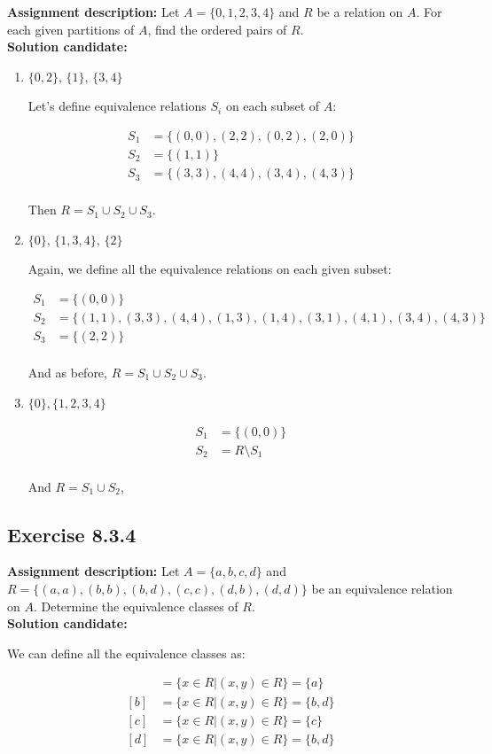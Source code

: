 \documentclass{report}
\newcommand{\mAlign}[1]{\begin{align*}#1\end{align*}}
\newcommand{\In}{\! \in \!}
\newcommand{\assignmentDescription}{\textbf{Assignment description: }}
\newcommand{\solution}{\textbf{Solution candidate: }}
\newcommand{\Exercise}[1]{\subsection{Exercise #1}}
\newcommand{\defaultEnumerateLabel}{\textbf{\alph*.}}
\begin{document}
	\assignmentDescription
	Let $A=\{0,1,2,3,4\}$ and $R$ be a relation on $A$. For each given partitions of $A$, find the ordered pairs of $R$.\\
	
	\solution
	
	\begin{enumerate}[label=\defaultEnumerateLabel]
		\item $\{0,2\}$, $\{1\}$, $\{3,4\}$
		
		Let's define equivalence relations $S_i$ on each subset of $A$:
		
		\mAlign{S_1&= \{(0,0),(2,2),(0,2),(2,0)\} \\ S_2 &= \{(1,1)\} \\ S_3 &= \{(3,3),(4,4),(3,4),(4,3)\} \\}
		
		Then $R = S_1 \cup S_2 \cup S_3$.
		
		
		\item $\{0\}$, $ \{1,3,4\} $, $ \{2\} $
		
		Again, we define all the equivalence relations on each given subset:
		
		\mAlign{S_1&= \{(0,0)\} \\ S_2 &= \{(1,1),(3,3),(4,4),(1,3),(1,4),(3,1),(4,1),(3,4),(4,3)\} \\ S_3 &= \{(2,2)\} \\}
		
		And as before, $R = S_1 \cup S_2 \cup S_3$.
		
		
		\item $\{0\},\{1,2,3,4\}$
		
		\mAlign{S_1&= \{(0,0)\} \\ S_2 &= R \setminus S_1 \\}
		
		And $R = S_1 \cup S_2$,
	\end{enumerate}
	
	\Exercise{8.3.4}
	
	\assignmentDescription
	Let $A=\{a,b,c,d\}$ and $R=\{(a,a),(b,b), (b,d),(c,c),(d,b),(d,d)\}$ be an equivalence relation on $A$. Determine the equivalence classes of $R$.\\
	
	\solution
	
	We can define all the equivalence classes as:
	
	\mAlign{[a] &= \{x \in R | (x,y) \In R\} = \{a\} \\
					[b] &= \{x \in R | (x,y) \In R\} = \{b,d\} \\
					[c] &= \{x \in R | (x,y) \In R\} = \{c\} \\
					[d] &= \{x \in R | (x,y) \In R\} = \{b,d\}}
	
\end{document}
